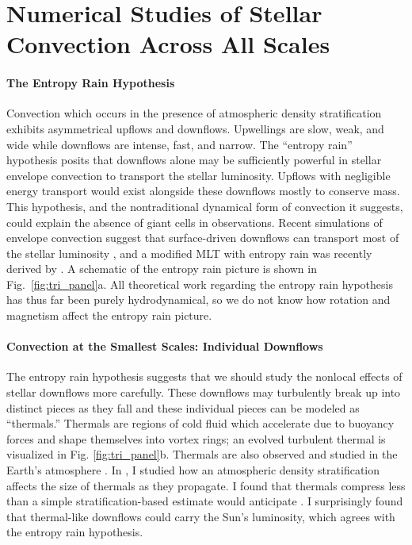 \documentclass[preprint, hmargin=1in, vmargin=1in]{aastex62}
\begin{document}
\section*{\textbf{Numerical Studies of Stellar Convection Across All Scales}}
\paragraph{The Entropy Rain Hypothesis}
Convection which occurs in the presence of atmospheric density stratification exhibits asymmetrical upflows and downflows.
Upwellings are slow, weak, and wide while downflows are intense, fast, and narrow.
The ``entropy rain'' hypothesis \citep[][]{spruit1997} posits that downflows alone may be sufficiently powerful in stellar envelope convection to transport the stellar luminosity.
Upflows with negligible energy transport would exist alongside these downflows mostly to conserve mass.
This hypothesis, and the nontraditional dynamical form of convection it suggests, could explain the absence of giant cells in observations.
Recent simulations of envelope convection suggest that surface-driven downflows can transport most of the stellar luminosity \citep{kapyla&all2017}, and a modified MLT with entropy rain was recently derived by \citet{brandenburg2016}.
A schematic of the entropy rain picture is shown in Fig.~\ref{fig:tri_panel}a.
All theoretical work regarding the entropy rain hypothesis has thus far been purely hydrodynamical, so we do not know how rotation and magnetism affect the entropy rain picture.


\paragraph{Convection at the Smallest Scales: Individual Downflows} 
The entropy rain hypothesis suggests that we should study the nonlocal effects of stellar downflows more carefully.
These downflows may turbulently break up into distinct pieces as they fall and these individual pieces can be modeled as ``thermals.''
Thermals are regions of cold fluid which accelerate due to buoyancy forces and shape themselves into vortex rings; an evolved turbulent thermal is visualized in Fig. \ref{fig:tri_panel}b.
Thermals are also observed and studied in the Earth's atmosphere \citep{lecoanet&jeevanjee2019}.
In \citet{andersLB2019}, I studied how an atmospheric density stratification affects the size of thermals as they propagate.
I found that thermals compress less than a simple stratification-based estimate would anticipate \citep{brandenburg2016}.
I surprisingly found that thermal-like downflows could carry the Sun's luminosity, which agrees with the entropy rain hypothesis.
\end{document}
